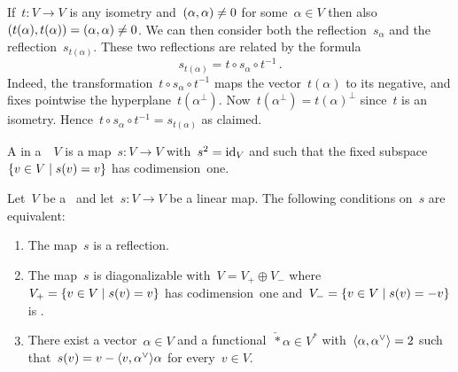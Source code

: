 \begin{recall}
\begin{enumerate}
      If~$t \colon V \to V$ is any isometry and~$(\alpha, \alpha) \neq 0$ for some~$\alpha \in V$ then also~$(t(\alpha), t(\alpha)) = (\alpha, \alpha) \neq 0$.
      We can then consider both the reflection~$s_\alpha$ and the reflection~$s_{t(\alpha)}$.
      These two reflections are related by the formula
      \[
        s_{t(\alpha)}
        =
        t \circ s_{\alpha} \circ t^{-1} \,.
      \]
      Indeed, the transformation~$t \circ s_{\alpha} \circ t^{-1}$ maps the vector~$t(\alpha)$ to its negative, and fixes pointwise the hyperplane~$t(\alpha^\perp)$.
      Now~$t(\alpha^\perp) = t(\alpha)^\perp$ since~$t$ is an isometry.
      Hence~$t \circ s_{\alpha} \circ t^{-1}  = s_{t(\alpha)}$ as claimed.
  \end{enumerate}
\end{recall}


\begin{definition}
  A  in a~{\vectorspace{$\kf$}}~$V$ is a map~$s \colon V \to V$ with~$s^2 = \operatorname{id}_V$ and such that the fixed subspace~$\{v \in V \suchthat s(v) = v\}$ has codimension~one.
\end{definition}


\begin{lemma}
  Let~$V$ be a~{\vectorspace{$\kf$}} and let~$s \colon V \to V$ be a linear map.
  The following conditions on~$s$ are equivalent:
  \begin{enumerate}
    \item
      \label{is a reflection}
      The map~$s$ is a reflection.
    \item
      \label{is suitable diagonalizable}
      The map~$s$ is diagonalizable with~$V = V_+ \oplus V_-$ where~$V_+ = \{v \in V \suchthat s(v) = v\}$ has codimension~one and~$V_- = \{v \in V \suchthat s(v) = -v\}$ is {\onedimensional}.
    \item
      \label{existence of dual check}
      There exist a vector~$\alpha \in V$ and a functional~$\check*{\alpha} \in V^*$ with~$\pair{\alpha, \check{\alpha}} = 2$ such that~$s(v) = v - \pair{v, \check{\alpha}} \alpha$ for every~$v \in V$.
  \end{enumerate}
\end{lemma}


